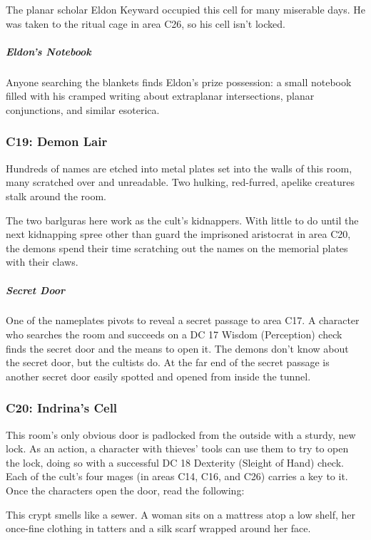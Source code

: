 \documentclass[10pt,a4paper,twoside,bg=print,twocolumn,openany,nodeprecatedcode]{dndbook}
\begin{document}
The planar scholar Eldon Keyward occupied this cell for many miserable days. He was taken to the ritual cage in area C26, so his cell isn't locked.

\subparagraph{Eldon's Notebook}
Anyone searching the blankets finds Eldon's prize possession: a small notebook filled with his cramped writing about extraplanar intersections, planar conjunctions, and similar esoterica.

\subsubsection{C19: Demon Lair}
\begin{DndReadAloud}{}
Hundreds of names are etched into metal plates set into the walls of this room, many scratched over and unreadable. Two hulking, red-furred, apelike creatures stalk around the room.

\end{DndReadAloud}

The two barlguras here work as the cult's kidnappers. With little to do until the next kidnapping spree other than guard the imprisoned aristocrat in area C20, the demons spend their time scratching out the names on the memorial plates with their claws.

\subparagraph{Secret Door}
One of the nameplates pivots to reveal a secret passage to area C17. A character who searches the room and succeeds on a DC 17 Wisdom (Perception) check finds the secret door and the means to open it. The demons don't know about the secret door, but the cultists do. At the far end of the secret passage is another secret door easily spotted and opened from inside the tunnel.

\subsubsection{C20: Indrina's Cell}
This room's only obvious door is padlocked from the outside with a sturdy, new lock. As an action, a character with thieves' tools can use them to try to open the lock, doing so with a successful DC 18 Dexterity (Sleight of Hand) check. Each of the cult's four mages (in areas C14, C16, and C26) carries a key to it. Once the characters open the door, read the following:

\begin{DndReadAloud}{}
This crypt smells like a sewer. A woman sits on a mattress atop a low shelf, her once-fine clothing in tatters and a silk scarf wrapped around her face.

\end{DndReadAloud}
\end{document}
